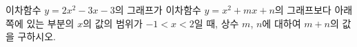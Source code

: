 \hspace*{2mm}\begin{minipage}[t]{\dimexpr\linewidth-2mm\relax}\vspace{0pt}
이차함수 $y=2x^2-3x-3$의 그래프가 이차함수 $y=x^2+mx+n$의 그래프보다 아래쪽에 있는 부분의 $x$의 값의 범위가 $-1<x<2$일 때, 상수 $m$, $n$에 대하여 $m+n$의 값을 구하시오.\end{minipage}
